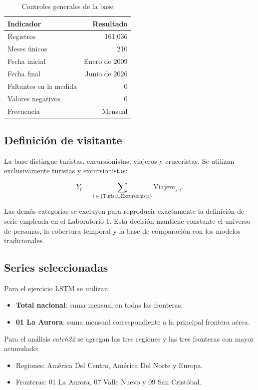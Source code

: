 \documentclass[11pt,letterpaper]{article}
\begin{document}
\begin{table}[H]
\centering
\caption{Controles generales de la base}
\begin{tabular}{lr}
\toprule
\textbf{Indicador} & \textbf{Resultado}\\
\midrule
Registros & 161,036\\
Meses únicos & 210\\
Fecha inicial & Enero de 2009\\
Fecha final & Junio de 2026\\
Faltantes en la medida & 0\\
Valores negativos & 0\\
Frecuencia & Mensual\\
\bottomrule
\end{tabular}
\end{table}

\subsection{Definición de visitante}

La base distingue turistas, excursionistas, viajeros y cruceristas. Se
utilizan exclusivamente turistas y excursionistas:

\[
Y_t =
\sum_{i \in \{\text{Turista},\text{Excursionista}\}}
\text{Viajero}_{i,t}.
\]

Las demás categorías se excluyen para reproducir exactamente la definición de
serie empleada en el Laboratorio 1. Esta decisión mantiene constante el
universo de personas, la cobertura temporal y la base de comparación con los
modelos tradicionales.

\subsection{Series seleccionadas}

Para el ejercicio LSTM se utilizan:

\begin{itemize}
  \item \textbf{Total nacional}: suma mensual en todas las fronteras.
  \item \textbf{01 La Aurora}: suma mensual correspondiente a la principal
  frontera aérea.
\end{itemize}

Para el análisis \textit{catch22} se agregan las tres regiones y las tres
fronteras con mayor acumulado:

\begin{itemize}
  \item Regiones: América Del Centro, América Del Norte y Europa.
  \item Fronteras: 01 La Aurora, 07 Valle Nuevo y 09 San Cristóbal.
\end{itemize}
\end{document}
